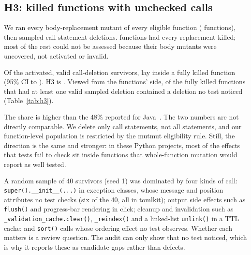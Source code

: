 \subsection{H3: killed functions with unchecked calls}

We ran every body-replacement mutant of every eligible function (\HThreeFns{} functions), then \HThreeCalls{} sampled call-statement deletions. \HThreeFnsFullyKilled{} functions had every replacement killed; most of the rest could not be assessed because their body mutants were uncovered, not activated or invalid.

Of the \HThreeSurvivors{} activated, valid call-deletion survivors, \HThreeShare{} lay inside a fully killed function (95\% CI \HThreeLo{} to \HThreeHi{}). H3 is \textbf{\HThreeSupported}. Viewed from the functions' side, \HThreeFKWithSurv{} of the \HThreeFKFns{} fully killed functions that had at least one valid sampled deletion contained a deletion no test noticed (Table~\ref{tab:h3}).

The share is higher than the 48\% reported for Java~\cite{maton2024pseudo}. The two numbers are not directly comparable. We delete only call statements, not all statements, and our function-level population is restricted by the mutmut eligibility rule. Still, the direction is the same and stronger: in these Python projects, most of the effects that tests fail to check sit inside functions that whole-function mutation would report as well tested.

A random sample of 40 survivors (seed 1) was dominated by four kinds of call: \texttt{super().\_\_init\_\_(...)} in exception classes, whose message and position attributes no test checks (six of the 40, all in tomlkit); output side effects such as \texttt{flush()} and progress-bar rendering in click; cleanup and invalidation such as \texttt{\_validation\_cache.clear()}, \texttt{\_reindex()} and a linked-list \texttt{unlink()} in a TTL cache; and \texttt{sort()} calls whose ordering effect no test observes. Whether each matters is a review question. The audit can only show that no test noticed, which is why it reports these as candidate gaps rather than defects.


